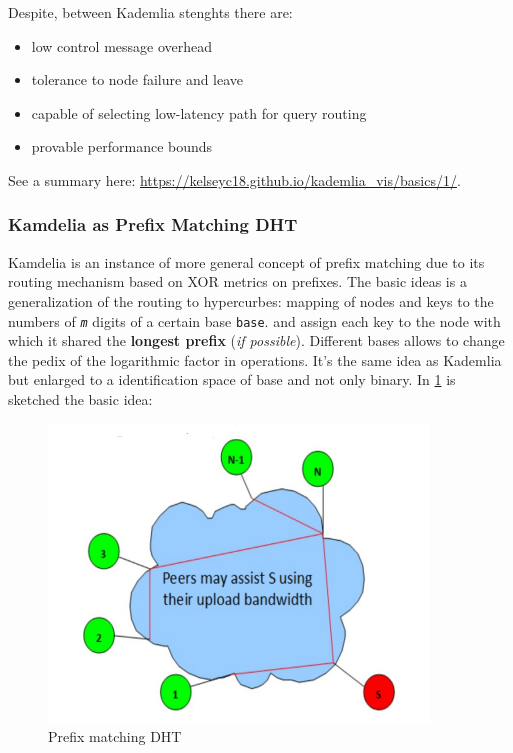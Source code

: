 \documentclass[10pt,a4paper]{report}
\begin{document}
Despite, between Kademlia stenghts there are:
\begin{itemize}
	\item 
	low control message overhead
	\item 
		tolerance to node failure and leave
	\item 
	capable of selecting low-latency path for query routing
	\item 
	provable performance bounds
\end{itemize}

See a summary here: \href{https://kelseyc18.github.io/kademlia_vis/basics/1/}{https://kelseyc18.github.io/kademlia\_vis/basics/1/}.
\subsubsection{Kamdelia as Prefix Matching DHT}\label{sec:kamdelia-as-prefix-matching-dht}
Kamdelia is an instance of more general concept of prefix matching due to its routing mechanism based on XOR metrics on prefixes.
The basic ideas is a generalization of the routing to hypercurbes: mapping of nodes and keys to the numbers of \textit{\texttt{m}} digits of a certain base \texttt{base}. and assign each key to the node with which it shared the \textbf{longest prefix} (\textit{if possible}). Different bases allows to change the pedix of the logarithmic factor in operations. It's the same idea as Kademlia but enlarged to a identification space of base and not only binary.
In \ref{prefix-dht} is sketched the basic idea:

\begin{figure}[h!]
	\centering
	\includegraphics[scale=0.60]{images/Pasted image 20230310120027.png}
	\caption{Prefix matching DHT}
	\label{prefix-dht}
\end{figure}
\end{document}
